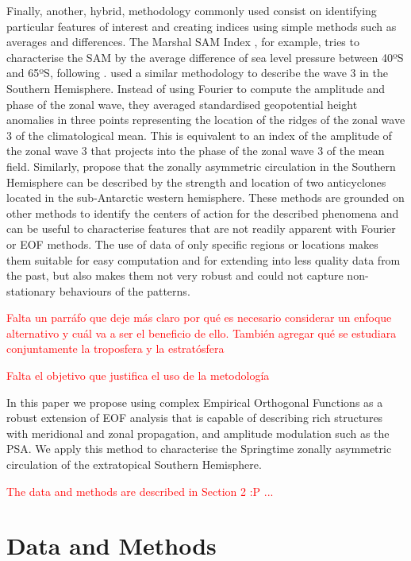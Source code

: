 \documentclass[smallextended]{svjour3}       %
\begin{document}
Finally, another, hybrid, methodology commonly used consist on identifying particular features of interest and creating indices using simple methods such as averages and differences.
The Marshal SAM Index \citep{marshall2003}, for example, tries to characterise the SAM by the average difference of sea level pressure between 40ºS and 65ºS, following \citet{gong1999}.
\citet{raphael2004} used a similar methodology to describe the wave 3 in the Southern Hemisphere.
Instead of using Fourier to compute the amplitude and phase of the zonal wave, they averaged standardised geopotential height anomalies in three points representing the location of the ridges of the zonal wave 3 of the climatological mean.
This is equivalent to an index of the amplitude of the zonal wave 3 that projects into the phase of the zonal wave 3 of the mean field.
Similarly, \citet{hobbs2010} propose that the zonally asymmetric circulation in the Southern Hemisphere can be described by the strength and location of two anticyclones located in the sub-Antarctic western hemisphere.
These methods are grounded on other methods to identify the centers of action for the described phenomena and can be useful to characterise features that are not readily apparent with Fourier or EOF methods.
The use of data of only specific regions or locations makes them suitable for easy computation and for extending into less quality data from the past, but also makes them not very robust and could not capture non-stationary behaviours of the patterns.

\textcolor{red}{Falta un parráfo que deje más claro por qué es necesario considerar un enfoque alternativo y cuál va a ser el beneficio de ello. También agregar qué se estudiara conjuntamente la troposfera y la estratósfera }

\textcolor{red}{Falta el objetivo que justifica el uso de la metodología}

In this paper we propose using complex Empirical Orthogonal Functions \citep{horel1984} as a robust extension of EOF analysis that is capable of describing rich structures with meridional and zonal propagation, and amplitude modulation such as the PSA.
We apply this method to characterise the Springtime zonally asymmetric circulation of the extratopical Southern Hemisphere.

\textcolor{red}{The data and methods are described in Section 2 :P ...}

\hypertarget{data-and-methods}{%
\section{Data and Methods}\label{data-and-methods}}
\end{document}
